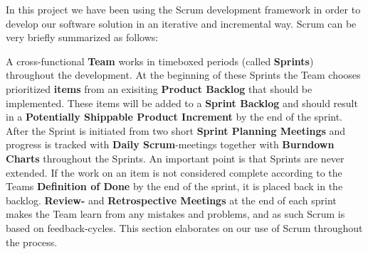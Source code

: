 In this project we have been using the Scrum development framework in order to develop our software solution in an iterative and incremental way. Scrum can be very briefly summarized as follows:

A cross-functional \textbf{Team} works in timeboxed periods (called \textbf{Sprints}) throughout the development. At the beginning of these Sprints the Team chooses prioritized \textbf{items} from an exisiting \textbf{Product Backlog} that should be implemented. These items will be added to a \textbf{Sprint Backlog} and should result in a \textbf{ Potentially Shippable Product Increment} by the end of the sprint.
After the Sprint is initiated from two short \textbf{Sprint Planning Meetings} and progress is tracked with \textbf{Daily Scrum}-meetings together with \textbf{Burndown Charts} throughout the Sprints. An important point is that Sprints are never extended. If the work on an item is not considered complete according to the Teams \textbf{Definition of Done} by the end of the sprint, it is placed back in the backlog.
\textbf{Review-} and \textbf{Retrospective Meetings} at the end of each sprint makes the Team learn from any mistakes and problems, and as such Scrum is based on feedback-cycles.
This section elaborates on our use of Scrum throughout the process.